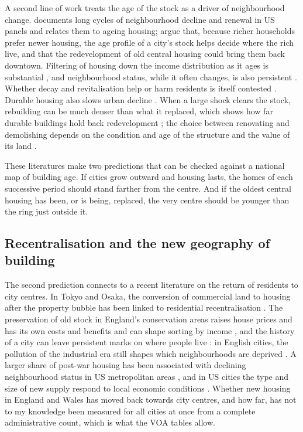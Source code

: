 A second line of work treats the age of the stock as a driver of neighbourhood change. \citet{rosenthal2008} documents long cycles of neighbourhood decline and renewal in US panels and relates them to ageing housing; \citet{brueckner2009} argue that, because richer households prefer newer housing, the age profile of a city's stock helps decide where the rich live, and that the redevelopment of old central housing could bring them back downtown. Filtering of housing down the income distribution as it ages is substantial \citep{rosenthal2014}, and neighbourhood status, while it often changes, is also persistent \citep{rosenthal2015,malone2018}. Whether decay and revitalisation help or harm residents is itself contested \citep{vigdor2010}. Durable housing also slows urban decline \citep{glaeser2005}. When a large shock clears the stock, rebuilding can be much denser than what it replaced, which shows how far durable buildings hold back redevelopment \citep{siodla2015}; the choice between renovating and demolishing depends on the condition and age of the structure and the value of its land \citep{munneke2015,dube2018}.

These literatures make two predictions that can be checked against a national map of building age. If cities grow outward and housing lasts, the homes of each successive period should stand farther from the centre. And if the oldest central housing has been, or is being, replaced, the very centre should be younger than the ring just outside it.

\subsection{Recentralisation and the new geography of building}
The second prediction connects to a recent literature on the return of residents to city centres. In Tokyo and Osaka, the conversion of commercial land to housing after the property bubble has been linked to residential recentralisation \citep{xu2023}. The preservation of old stock in England's conservation areas raises house prices and has its own costs and benefits \citep{waights2019} and can shape sorting by income \citep{vanduijn2021}, and the history of a city can leave persistent marks on where people live \citep{hanlon2022}: in English cities, the pollution of the industrial era still shapes which neighbourhoods are deprived \citep{heblich2021}. A larger share of post-war housing has been associated with declining neighbourhood status in US metropolitan areas \citep{rolheiser2021}, and in US cities the type and size of new supply respond to local economic conditions \citep{hilber2021}. Whether new housing in England and Wales has moved back towards city centres, and how far, has not to my knowledge been measured for all cities at once from a complete administrative count, which is what the VOA tables allow.

